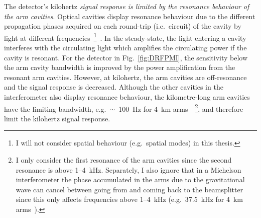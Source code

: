 The detector's kilohertz \emph{signal response is limited by the resonance behaviour of the arm cavities}.
Optical cavities display resonance behaviour due to the different propagation phases acquired on each round-trip (i.e.\ circuit) of the cavity by light at different frequencies~\footnote{I will not consider spatial behaviour (e.g.\ spatial modes) in this thesis.}~\cite{hodgson_1997}. In the steady-state, the light entering a cavity interferes with the circulating light which amplifies the circulating power if the cavity is resonant. %
For the detector in Fig.~\ref{fig:DRFPMI}, the sensitivity below the arm cavity bandwidth is improved by the power amplification from the resonant arm cavities. However, at kilohertz, the arm cavities are off-resonance and the signal response is decreased. %
Although the other cavities in the interferometer also display resonance behaviour, the kilometre-long arm cavities have the limiting bandwidth, e.g.\ $\sim$~100~Hz for 4~km arms~\cite{AdvancedLIGO:2015}~\footnote{I only consider the first resonance of the arm cavities since the second resonance is above 1--4~kHz. Separately, I also ignore that in a Michelson interferometer the phase accumulated in the arms due to the gravitational wave can cancel between going from and coming back to the beamsplitter since this only affects frequencies above 1--4~kHz (e.g.\ 37.5~kHz for 4~km arms~\cite{AdvancedLIGO:2015,bond_2010}).}, and therefore limit the kilohertz signal response. %


